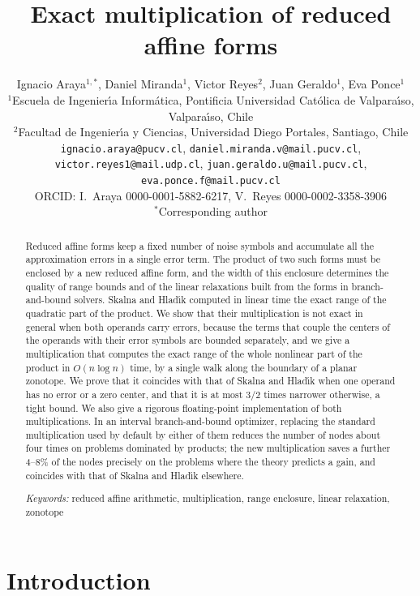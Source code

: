 \documentclass[11pt]{article}
\title{Exact multiplication of reduced affine forms}
\author{Ignacio Araya$^{1,*}$, Daniel Miranda$^{1}$, Victor Reyes$^{2}$, Juan Geraldo$^{1}$, Eva Ponce$^{1}$\\[2mm]
\small $^{1}$Escuela de Ingenier\'{\i}a Inform\'atica, Pontificia Universidad Cat\'olica de Valpara\'{\i}so, Valpara\'{\i}so, Chile\\
\small $^{2}$Facultad de Ingenier\'{\i}a y Ciencias, Universidad Diego Portales, Santiago, Chile\\[1mm]
\small \texttt{ignacio.araya@pucv.cl}, \texttt{daniel.miranda.v@mail.pucv.cl},\\ \small \texttt{victor.reyes1@mail.udp.cl}, \texttt{juan.geraldo.u@mail.pucv.cl}, \texttt{eva.ponce.f@mail.pucv.cl}\\[1mm]
\small ORCID: I.~Araya 0000-0001-5882-6217, V.~Reyes 0000-0002-3358-3906\\[1mm]
\small $^{*}$Corresponding author}
\date{}
\theoremstyle{definition}
\begin{document}
\maketitle

\begin{abstract}
Reduced affine forms keep a fixed number of noise symbols and accumulate all the approximation errors in a single error term. The product of two such forms must be enclosed by a new reduced affine form, and the width of this enclosure determines the quality of range bounds and of the linear relaxations built from the forms in branch-and-bound solvers. Skalna and Hlad\'{\i}k computed in linear time the exact range of the quadratic part of the product. We show that their multiplication is not exact in general when both operands carry errors, because the terms that couple the centers of the operands with their error symbols are bounded separately, and we give a multiplication that computes the exact range of the whole nonlinear part of the product in $O(n\log n)$ time, by a single walk along the boundary of a planar zonotope. We prove that it coincides with that of Skalna and Hlad\'{\i}k when one operand has no error or a zero center, and that it is at most $3/2$ times narrower otherwise, a tight bound. We also give a rigorous floating-point implementation of both multiplications. In an interval branch-and-bound optimizer, replacing the standard multiplication used by default by either of them reduces the number of nodes about four times on problems dominated by products; the new multiplication saves a further 4--8\% of the nodes precisely on the problems where the theory predicts a gain, and coincides with that of Skalna and Hlad\'{\i}k elsewhere.

\medskip\noindent
\textit{Keywords:} reduced affine arithmetic, multiplication, range enclosure, linear relaxation, zonotope
\end{abstract}

\section{Introduction}
\end{document}
